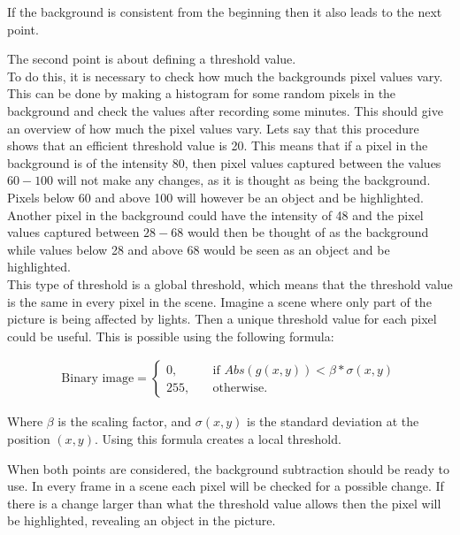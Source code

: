 If the background is consistent from the beginning then it also leads to the next point. 

The second point is about defining a threshold value. \\
To do this, it is necessary to check how much the backgrounds pixel values vary. This can be done by making a histogram for some random pixels in the background and check the values after recording some minutes. This should give an overview of how much the pixel values vary. Lets say that this procedure shows that an efficient threshold value is 20. This means that if a pixel in the background is of the intensity 80, then pixel values captured between the values $60-100$ will not make any changes, as it is thought as being the background. Pixels below 60 and above 100 will however be an object and be highlighted.
Another pixel in the background could have the intensity of 48 and the pixel values captured between $28-68$ would then be thought of as the background while values below 28 and above 68 would be seen as an object and be highlighted. \\
This type of threshold is a global threshold, which means that the threshold value is the same in every pixel in the scene. Imagine a scene where only part of the picture is being affected by lights. Then a unique threshold value for each pixel could be useful. This is possible using the following formula:

\begin{equation}
	\begin{aligned}
  		\ \text{Binary image} = \left\{ \begin{array}{ll}
         0, \quad &\text{if } Abs(g(x,y))<\beta * \sigma(x,y)\\
        255, \quad &\text{otherwise}.
        \end{array} \right . \ 
 	\end{aligned}
\end{equation} 

Where $\beta$ is the scaling factor, and $\sigma(x,y)$ is the standard deviation at the position $(x,y)$. Using this formula creates a local threshold.

When both points are considered, the background subtraction should be ready to use. In every frame in a scene each pixel will be checked for a possible change. If there is a change larger than what the threshold value allows then the pixel will be highlighted, revealing an object in the picture.

